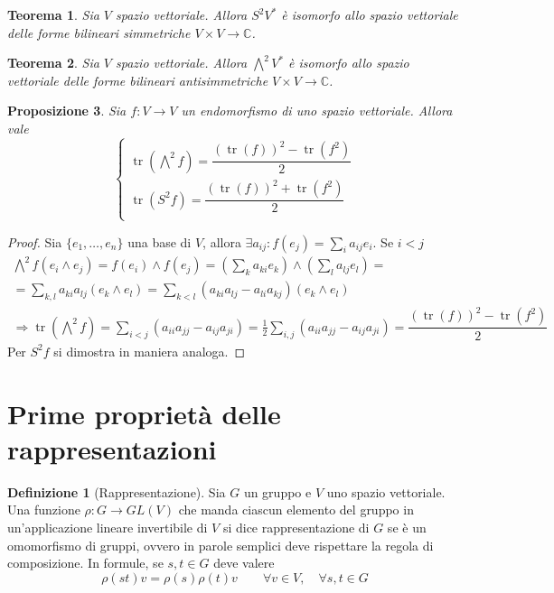 \documentclass[11pt]{article}
\theoremstyle{plain}
\newtheorem{thm}{Teorema}[section]
\newtheorem{prop}[thm]{Proposizione}
\theoremstyle{definition}
\newtheorem{defn}{Definizione}[section]
\theoremstyle{remark}
\newcommand{\C}{\mathbb{C}}
\DeclareMathOperator{\tr}{tr}
\begin{document}
\begin{thm}
Sia $V$ spazio vettoriale. Allora $S^2V^*$ è isomorfo allo spazio vettoriale delle forme bilineari simmetriche $V\times V\to \C$.
\end{thm}
\begin{thm}
Sia $V$ spazio vettoriale. Allora $\bigwedge^2V^*$ è isomorfo allo spazio vettoriale delle forme bilineari antisimmetriche $V\times V\to \C$.
\end{thm}


\begin{prop}
Sia $f: V \to V$ un endomorfismo di uno spazio vettoriale. Allora vale
\[ 
\begin{cases}
\tr(\bigwedge^2 f ) = \dfrac{(\tr(f))^2 - \tr(f^2)}{2} \\
\tr(S^2 f ) = \dfrac{(\tr(f))^2 + \tr(f^2)}{2} \\
\end{cases}
\]
\label{thm:tracciasymalt}
\end{prop}


\begin{proof} Sia $\{e_1,\ldots,e_n\}$ una base di $V$, allora $\exists a_{ij}: f(e_j)=\sum_i a_{ij}e_i$. Se $i<j$
\begin{gather*}
\bigwedge^2f(e_i\wedge e_j)=f(e_i)\wedge f(e_j)=\left(\sum_k a_{ki}e_k\right)\wedge\left(\sum_l a_{lj}e_l\right)=\\
=\sum_{k,l}a_{ki}a_{lj}(e_k\wedge e_l)=\sum_{k<l}(a_{ki}a_{lj}-a_{li}a_{kj})(e_k\wedge e_l)\\
\Rightarrow \tr(\bigwedge^2f)=\sum_{i<j}(a_{ii}a_{jj}-a_{ij}a_{ji})=\frac{1}{2}\sum_{i,j}(a_{ii}a_{jj}-a_{ij}a_{ji})= \dfrac{(\tr(f))^2 - \tr(f^2)}{2}
\end{gather*}
Per $S^2f$ si dimostra in maniera analoga. 

\end{proof}













\newpage
\section{Prime proprietà delle rappresentazioni}

\begin{defn}[Rappresentazione]
	Sia $G$ un gruppo e $V$ uno spazio vettoriale. Una funzione $\rho: G \to GL(V)$ che manda ciascun elemento del gruppo in un'applicazione lineare invertibile di $V$
	si dice rappresentazione di $G$ se è un omomorfismo di gruppi, ovvero in parole semplici deve rispettare la regola di composizione. In formule, se $s, t \in G$ deve valere
	\[ \rho(st) v = \rho(s)\rho(t) v \qquad \forall v \in V, \quad \forall s,t \in G\]
\end{defn}
\end{document}
